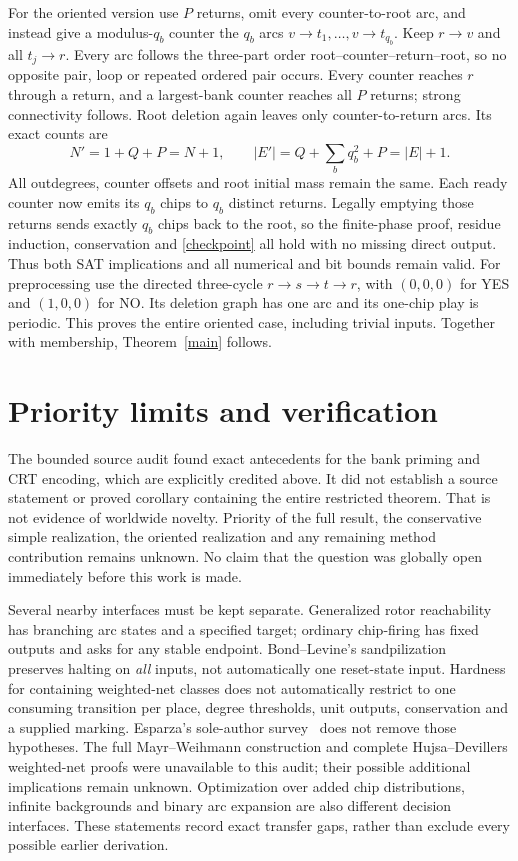\documentclass[11pt]{article}
\begin{document}
For the oriented version use $P$ returns, omit every counter-to-root arc,
and instead give a modulus-$q_b$ counter the $q_b$ arcs
$v\to t_1,\ldots,v\to t_{q_b}$. Keep $r\to v$ and all $t_j\to r$.
Every arc follows the three-part order root--counter--return--root, so no
opposite pair, loop or repeated ordered pair occurs. Every counter reaches
$r$ through a return, and a largest-bank counter reaches all $P$ returns;
strong connectivity follows. Root deletion again leaves only counter-to-return
arcs. Its exact counts are
\[
 N'=1+Q+P=N+1,\qquad |E'|=Q+\sum_b q_b^2+P=|E|+1.
\]
All outdegrees, counter offsets and root initial mass remain the same.
Each ready counter now emits its $q_b$ chips to $q_b$ distinct returns.
Legally emptying those returns sends exactly $q_b$ chips back to the root,
so the finite-phase proof, residue induction, conservation and
\eqref{checkpoint} all hold with no missing direct output. Thus both SAT
implications and all numerical and bit bounds remain valid. For preprocessing
use the directed three-cycle $r\to s\to t\to r$, with $(0,0,0)$ for YES
and $(1,0,0)$ for NO. Its deletion graph has one arc and its one-chip play
is periodic. This proves the entire oriented case, including trivial inputs.
Together with membership, Theorem~\ref{main} follows.

\section{Priority limits and verification}
The bounded source audit found exact antecedents for the bank priming and CRT
encoding, which are explicitly credited above. It did not establish a source
statement or proved corollary containing the entire restricted theorem.
That is not evidence of worldwide novelty. Priority of the full result,
the conservative simple realization, the oriented realization and any
remaining method contribution remains unknown. No claim that the question
was globally open immediately before this work is made.

Several nearby interfaces must be kept separate. Generalized rotor
reachability~\cite{ACE} has branching arc states and a specified target;
ordinary chip-firing has fixed outputs and asks for any stable endpoint.
Bond--Levine's sandpilization~\cite[Definition~6.5, Corollary~6.6]{BL} preserves
halting on \emph{all} inputs, not automatically one reset-state input.
Hardness for containing weighted-net classes does not automatically restrict
to one consuming transition per place, degree thresholds, unit outputs,
conservation and a supplied marking. Esparza's sole-author survey~\cite{Esparza}
does not remove those hypotheses. The full Mayr--Weihmann construction and
complete Hujsa--Devillers weighted-net proofs were unavailable to this audit;
their possible additional implications remain unknown. Optimization over
added chip distributions, infinite backgrounds and binary arc expansion are
also different decision interfaces. These statements record exact transfer
gaps, rather than exclude every possible earlier derivation.
\end{document}
